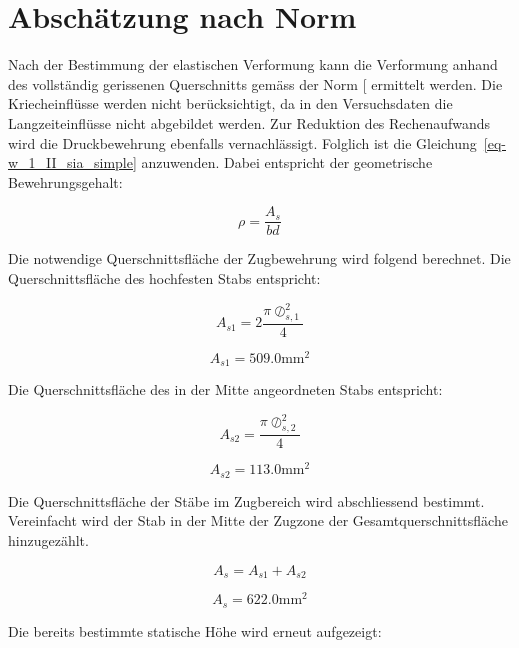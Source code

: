 \documentclass[
  12pt,
  letterpaper,
  egregdoesnotlikesansseriftitles]{scrreprt}
\begin{document}
\section{Abschätzung nach Norm}\label{abschuxe4tzung-nach-norm-1}

Nach der Bestimmung der elastischen Verformung kann die Verformung
anhand des vollständig gerissenen Querschnitts gemäss der Norm
{[}\citeproc{ref-SIA2013a}{6}{]} ermittelt werden. Die Kriecheinflüsse
werden nicht berücksichtigt, da in den Versuchsdaten die
Langzeiteinflüsse nicht abgebildet werden. Zur Reduktion des
Rechenaufwands wird die Druckbewehrung ebenfalls vernachlässigt.
Folglich ist die Gleichung~\ref{eq-w_1_II_sia_simple} anzuwenden. Dabei
entspricht der geometrische Bewehrungsgehalt:

\begin{equation}\rho = \frac{A_{s}}{b d}\end{equation}

Die notwendige Querschnittsfläche der Zugbewehrung wird folgend
berechnet. Die Querschnittsfläche des hochfesten Stabs entspricht:

\begin{equation}A_{s 1} = 2 \frac{\pi \oslash_{s,1}^{2}}{4}\end{equation}

\begin{equation}A_{s 1} = 509.0 \text{mm}^{2}\end{equation}

Die Querschnittsfläche des in der Mitte angeordneten Stabs entspricht:

\begin{equation}A_{s 2} = \frac{\pi \oslash_{s,2}^{2}}{4}\end{equation}

\begin{equation}A_{s 2} = 113.0 \text{mm}^{2}\end{equation}

Die Querschnittsfläche der Stäbe im Zugbereich wird abschliessend
bestimmt. Vereinfacht wird der Stab in der Mitte der Zugzone der
Gesamtquerschnittsfläche hinzugezählt.

\begin{equation}A_{s} = A_{s 1} + A_{s 2}\end{equation}

\begin{equation}A_{s} = 622.0 \text{mm}^{2}\end{equation}

Die bereits bestimmte statische Höhe wird erneut aufgezeigt:
\end{document}

